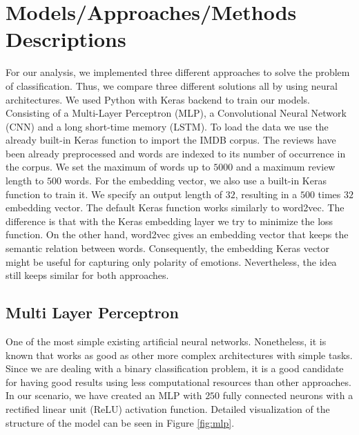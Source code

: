 \documentclass[conference]{IEEEtran}
\theoremstyle{plain}
\theoremstyle{definition}
\theoremstyle{remark}
\begin{document}
\section{Models/Approaches/Methods Descriptions}
\label{sec:model}


For our analysis, we implemented three different approaches to solve the problem of classification. Thus, we compare three different solutions all by using neural architectures. We used Python with Keras backend to train our models. Consisting of a Multi-Layer Perceptron (MLP), a Convolutional Neural Network (CNN) and a long short-time memory (LSTM).
To load the data we use the already built-in Keras function to import the IMDB corpus. The reviews have been already preprocessed and words are indexed to its number of occurrence in the corpus. We set the maximum of words up to $5000$ and a maximum review length to $500$ words.
For the embedding vector, we also use a built-in Keras function to train it. We specify an output length of $32$, resulting in a $500$ times $32$ embedding vector. The default Keras function works similarly to word2vec. The difference is that with the Keras embedding layer we try to minimize the loss function. On the other hand, word2vec gives an embedding vector that keeps the semantic relation between words. Consequently, the embedding Keras vector might be useful for capturing only polarity of emotions. Nevertheless, the idea still keeps similar for both approaches. 
\subsection{Multi Layer Perceptron}
One of the most simple existing artificial neural networks. Nonetheless, it is known that works as good as other more complex architectures with simple tasks. Since we are dealing with a binary classification problem, it is a good candidate for having good results using less computational resources than other approaches. In our scenario, we have created an MLP with $250$ fully connected neurons with a rectified linear unit (ReLU) activation function. Detailed visualization of the structure of the model can be seen in Figure \ref{fig:mlp}.
\end{document}
